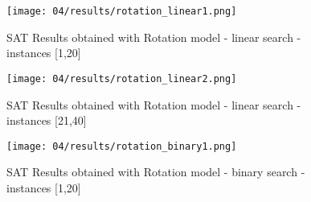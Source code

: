  \begin{figure}[H]
    \centering
    \texttt{[image: 04/results/rotation\_linear1.png]}
    \caption{
      SAT Results obtained with Rotation model - linear search - instances [1,20]
    }
    \label{fig:SAT_results_rotation_linear1}
  \end{figure}
  \begin{figure}[H]
    \centering
    \texttt{[image: 04/results/rotation\_linear2.png]}
    \caption{
      SAT Results obtained with Rotation model - linear search - instances [21,40]
    }
    \label{fig:SAT_results_rotation_linear2}
  \end{figure}   
  \begin{figure}[H]
    \centering
    \texttt{[image: 04/results/rotation\_binary1.png]}
    \caption{
      SAT Results obtained with Rotation model - binary search - instances [1,20]
    }
    \label{fig:SAT_results_rotation_binary1}
  \end{figure}

